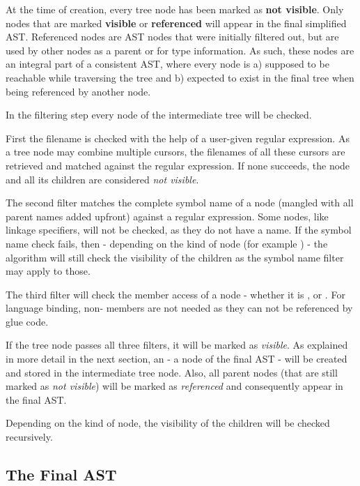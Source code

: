 At the time of creation, every tree node has been marked as \textbf{not visible}. Only nodes that are marked \textbf{visible} or \textbf{referenced} will appear in the final simplified AST. Referenced nodes are AST nodes that were initially filtered out, but are used by other nodes as a parent or for type information. As such, these nodes are an integral part of a consistent AST, where every node is a) supposed to be reachable while traversing the tree and b) expected to exist in the final tree when being referenced by another node.

In the filtering step every node of the intermediate tree will be checked.

First the filename is checked with the help of a user-given regular expression. As a tree node may combine multiple cursors, the filenames of all these cursors are retrieved and matched against the regular expression. If none succeeds, the node and all its children are considered \textit{not visible}.

The second filter matches the complete symbol name of a node (mangled with all parent names added upfront) against a regular expression. Some nodes, like linkage specifiers, will not be checked, as they do not have a name. If the symbol name check fails, then - depending on the kind of node (for example ) - the algorithm will still check the visibility of the children as the symbol name filter may apply to those.

The third filter will check the member access of a node - whether it is ,  or . For language binding, non- members are not needed as they can not be referenced by glue code.

If the tree node passes all three filters, it will be marked as \textit{visible}. As explained in more detail in the next section, an  - a node of the final AST - will be created and stored in the intermediate tree node. Also, all parent nodes (that are still marked as \textit{not visible}) will be marked as \textit{referenced} and consequently appear in the final AST.

Depending on the kind of node, the visibility of the children will be checked recursively.

\subsection{The Final AST}

